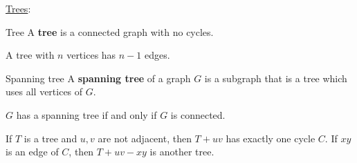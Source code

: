 \underline{Trees}:
\begin{Definition}{Tree}{}
    A \textbf{tree} is a connected graph with no cycles.
\end{Definition}
\begin{Proposition}{}{}
    A tree with $ n $ vertices has $ n-1 $ edges.
\end{Proposition}
\begin{Definition}{Spanning tree}{}
    A \textbf{spanning tree} of a graph $ G $ is a subgraph
    that is a tree which uses all vertices of $ G $.
\end{Definition}
\begin{Proposition}{}{}
    $ G $ has a spanning tree if and only if $ G $ is connected.
\end{Proposition}
\begin{Proposition}{}{}
    If $ T $ is a tree and $ u,v $ are not adjacent, then
    $ T+uv $ has exactly one cycle $ C $. If $ xy $ is an edge of
    $ C $, then $ T+uv-xy $ is another tree.
\end{Proposition}
